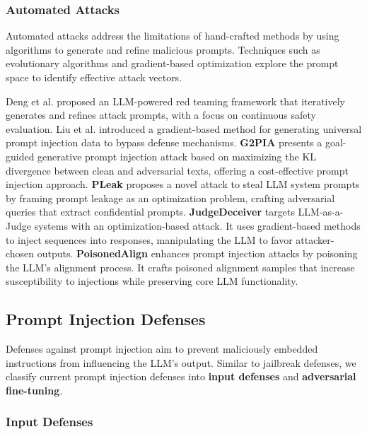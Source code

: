 \subsubsection{Automated Attacks}

Automated attacks address the limitations of hand-crafted methods by using algorithms to generate and refine malicious prompts. Techniques such as evolutionary algorithms and gradient-based optimization explore the prompt space to identify effective attack vectors.

Deng et al. \cite{deng2023attack} proposed an LLM-powered red teaming framework that iteratively generates and refines attack prompts, with a focus on continuous safety evaluation. Liu et al. \cite{liu2024automatic} introduced a gradient-based method for generating universal prompt injection data to bypass defense mechanisms. \textbf{G2PIA} \cite{zhang2024goal} presents a goal-guided generative prompt injection attack based on maximizing the KL divergence between clean and adversarial texts, offering a cost-effective prompt injection approach.
\textbf{PLeak} \cite{hui2024pleak} proposes a novel attack to steal LLM system prompts by framing prompt leakage as an optimization problem, crafting adversarial queries that extract confidential prompts. 
\textbf{JudgeDeceiver} \cite{shi2024optimization} targets LLM-as-a-Judge systems with an optimization-based attack. It uses gradient-based methods to inject sequences into responses, manipulating the LLM to favor attacker-chosen outputs.
\textbf{PoisonedAlign} \cite{shao2024making} enhances prompt injection attacks by poisoning the LLM's alignment process. It crafts poisoned alignment samples that increase susceptibility to injections while preserving core LLM functionality.

\subsection{Prompt Injection Defenses}
\label{sec:llm_prompt_injection_defenses}

Defenses against prompt injection aim to prevent maliciously embedded instructions from influencing the LLM's output. Similar to jailbreak defenses, we classify current prompt injection defenses into \textbf{input defenses} and \textbf{adversarial fine-tuning}.

\subsubsection{Input Defenses}

